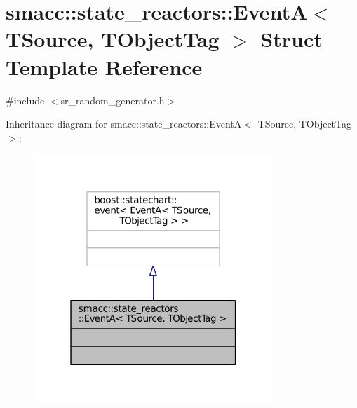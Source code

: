 \hypertarget{structsmacc_1_1state__reactors_1_1EventA}{}\section{smacc\+:\+:state\+\_\+reactors\+:\+:EventA$<$ T\+Source, T\+Object\+Tag $>$ Struct Template Reference}
\label{structsmacc_1_1state__reactors_1_1EventA}


{\ttfamily \#include $<$sr\+\_\+random\+\_\+generator.\+h$>$}



Inheritance diagram for smacc\+:\+:state\+\_\+reactors\+:\+:EventA$<$ T\+Source, T\+Object\+Tag $>$\+:
\nopagebreak
\begin{figure}[H]
\begin{center}
\leavevmode
\includegraphics[width=256pt]{structsmacc_1_1state__reactors_1_1EventA__inherit__graph}
\end{center}
\end{figure}


